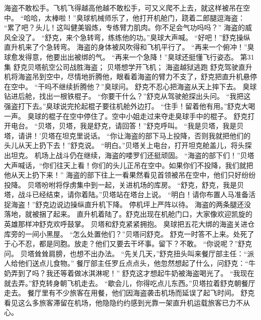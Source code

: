 \documentclass[a4paper,12pt,UTF8,twoside]{ctexbook}
\begin{document}
        海盗不敢松手。飞机飞得越高他越不敢松手，可又义爬不上去，就这样被吊在空中。 
        “哈哈，太棒啦！”臭球机械师乐了，他打开机舱门，跷着二郎腿逗海盗： 
        “累了吧？头儿！这叫健美锻炼，专练臂力肌肉。你不足会气功吗吗？” 
         海盗的威风全没了。 
        “舒克，来个急转弯，练练他的功。”臭球大声喊。 
        “好吧！”舒克操纵直升机来了个急转弯。 
        海盗的身体被风吹得和飞机平行了。 
        “再来一个俯冲！”臭球愈发得意，他要出出被绑的气。 
        “再来一个急降！”臭球还挺懂飞行姿态。   第31集 
        舒克贝塔航空公司战胜海盗； 
        贝塔想学开飞机； 
        海盗越狱逃跑   
        舒克驾驶直升机将海盗吊到空中，尽情地折腾他，眼看着海盗的臂力不支了，舒克把直升机悬停在空中。 
        “干吗不继续折腾他？”臭球问。 
        舒克不忍心把海盗从天上摔下去。 
        臭球钻进后舱，找出一根铁棍子。 
        “你要干什么？”舒克从驾驶舱探出头问。 
        “我把这强盗打下去。”臭球说完抡起棍子要往机舱外边打。 
        “住手！留着他有用。”舒克大喝一声。 
        臭球的棍子在空中停住了。空中小姐走过来夺走臭球手中的棍子。 
        舒克打开电台。 
        “贝塔，贝塔，我是舒克，请回答！”舒克呼叫。 
        “我是贝塔，我是贝塔，请讲！’贝塔在坦克里说话。 
        “你让海盗的部下马上投降，否则我就把他们的头儿从天上扔下去！”舒克说。 
        “明白。”贝塔关上电台，打开坦克舱盖儿，将头探出坦克。 
        机场上战斗仍在继续，海盗的喽罗们还挺顽固。 
        “海盗的部下们！”贝塔大声喊话，“你们往天上看！你们的头儿正吊在空中。如果你们不投降，我们就把他从天上扔下来！” 
        海盗的部下往上一看果然看见首领被吊在空中，他们只好纷纷投降。 
        贝塔吩咐将俘虏集中到一起，关进机场的库房。 
        “舒克，舒克，我是贝塔，战斗已经结束，请你着陆。”贝塔站在塔台上说。 
        “明白！请你布置人马准备活捉海盗！”舒克边说边操纵直升机下降。 
        停机坪上严阵以待。 
        海盗的两条腿还没落地，就被捆了起来。 
        直升机着陆了。舒克出现在机舱门口，大家像欢迎凯旋的英雄那样冲舒克欢呼鼓掌。 
        贝塔和舒克紧紧拥抱。 
        臭球把五花大绑的海盗关进仓库旁的一间小黑屋。 
        “怎么处置他们？”贝塔问舒克。 
        舒克一时答不上来。处死了于心不忍，都是同胞。放走？他们又要去干坏事。留下？不敢。 
        “你说呢？”舒克问。 
        贝塔耸耸肩膀，也想不出办法。 
        “先关几天，”舒克扭头叫来餐厅部主任：“派人给他们送点儿食物。” 
        餐厅部主任罗丘点点头，他忽然想起了什么，问舒克：“牛奶弄到了吗？我还等着做冰淇淋呢！” 
        舒克这才想起牛奶被海盗喝光了。 
        “我现在就去弄。”舒克转身朝飞机走去。 
        “歇会儿，你得吃点儿东西。”贝塔拉着舒克朝餐厅走去。 
        餐厅里有不少旅客在用餐，他们因海盗袭击机场而延误了起飞时间。 
        舒克看见这么多旅客滞留在机场，他隐隐约约感到光靠一架直升机运载旅客已力不从心。 
\end{document}
